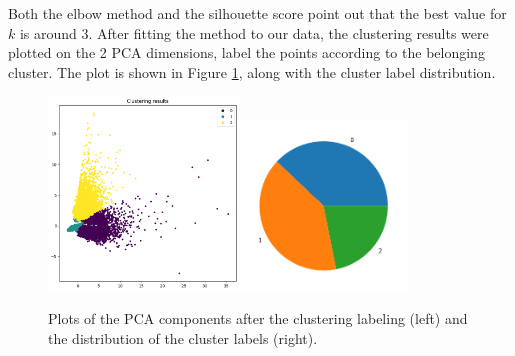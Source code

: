 \documentclass[10pt,a4paper]{report}
\begin{document}
Both the elbow method and the silhouette score point out that the best value for $k$ is around 3.
After fitting the method to our data, the clustering results were plotted on the 2 PCA dimensions, label the points according to the belonging cluster.
The plot is shown in Figure \ref{kmeans_pca}, along with the cluster label distribution.
\begin{figure}[h]
	\centering
	\includegraphics[width=0.45\textwidth]{kmeans_pca}\includegraphics[width=0.4\textwidth]{kmeans_pie}
	\caption{Plots of the PCA components after the clustering labeling (left) and the distribution of the cluster labels (right).}
	\label{kmeans_pca}
\end{figure}
\end{document}
